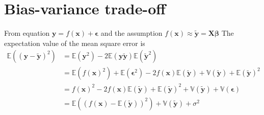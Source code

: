 \section{Bias-variance trade-off}
From equation $\boldsymbol{y} = f(\boldsymbol{x}) + \boldsymbol{\epsilon}$ and the assumption $f(\boldsymbol{x}) \approx \boldsymbol{\tilde{y}} = \boldsymbol{X \beta}$
The expectation value of the mean square error is 
\begin{align*}\label{eq:bias_variance}
	\mathbb{E}((\boldsymbol{y} - \boldsymbol{\tilde{y}})^{2}) &= \mathbb{E}(\boldsymbol{y}^{2}) - 2 \mathbb{E}(\boldsymbol{y} \boldsymbol{\tilde{y}}) \mathbb{E}(\boldsymbol{\tilde{y}}^{2}) \\
	&= \mathbb{E}(f(\boldsymbol{x})^{2}) + \mathbb{E}(\boldsymbol{\epsilon}^{2}) - 2 f(\boldsymbol{x}) \mathbb{E}(\boldsymbol{\tilde{y}}) + \mathbb{V}(\boldsymbol{\tilde{y}}) + \mathbb{E}(\boldsymbol{\tilde{y}})^{2} \\
	&= f(\boldsymbol{x})^{2} - 2 f(\boldsymbol{x}) \mathbb{E}(\boldsymbol{\tilde{y}}) + \mathbb{E}(\boldsymbol{\tilde{y}})^{2} + \mathbb{V}(\boldsymbol{\tilde{y}}) + \mathbb{V}(\boldsymbol{\epsilon}) \\
	&= \mathbb{E}((f(\boldsymbol{x}) - \mathbb{E}(\boldsymbol{\tilde{y}}))^{2}) + \mathbb{V}(\boldsymbol{\tilde{y}}) + \sigma^{2}
\end{align*}


